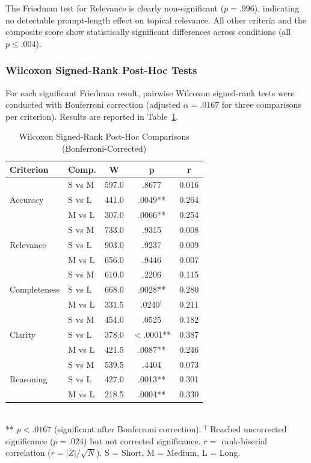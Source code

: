 \documentclass[conference]{IEEEtran}
\begin{document}
The Friedman test for Relevance is clearly non-significant ($p=.996$), indicating no detectable prompt-length effect on topical relevance. All other criteria and the composite score show statistically significant differences across conditions (all $p \leq .004$).

\subsubsection{Wilcoxon Signed-Rank Post-Hoc Tests}
For each significant Friedman result, pairwise Wilcoxon signed-rank tests were conducted with Bonferroni correction (adjusted $\alpha=.0167$ for three comparisons per criterion). Results are reported in Table~\ref{tab:wilcoxon}.

\begin{table}[htbp]
\caption{Wilcoxon Signed-Rank Post-Hoc Comparisons (Bonferroni-Corrected)}
\label{tab:wilcoxon}
\centering
\begin{tabular}{llccc}
\toprule
\textbf{Criterion} & \textbf{Comp.} & \textbf{W} & \textbf{p} & \textbf{r} \\
\midrule
\multirow{3}{*}{Accuracy} & S vs M & 597.0 & .8677 & 0.016 \\
 & S vs L & 441.0 & .0049** & 0.264 \\
 & M vs L & 307.0 & .0066** & 0.254 \\
\midrule
\multirow{3}{*}{Relevance} & S vs M & 733.0 & .9315 & 0.008 \\
 & S vs L & 903.0 & .9237 & 0.009 \\
 & M vs L & 656.0 & .9446 & 0.007 \\
\midrule
\multirow{3}{*}{Completeness} & S vs M & 610.0 & .2206 & 0.115 \\
 & S vs L & 668.0 & .0028** & 0.280 \\
 & M vs L & 331.5 & .0240$^\dagger$ & 0.211 \\
\midrule
\multirow{3}{*}{Clarity} & S vs M & 454.0 & .0525 & 0.182 \\
 & S vs L & 378.0 & $<$.0001** & 0.387 \\
 & M vs L & 421.5 & .0087** & 0.246 \\
\midrule
\multirow{3}{*}{Reasoning} & S vs M & 539.5 & .4404 & 0.073 \\
 & S vs L & 427.0 & .0013** & 0.301 \\
 & M vs L & 218.5 & .0004** & 0.330 \\
\bottomrule
\end{tabular}
\\[4pt]
\footnotesize{** $p<.0167$ (significant after Bonferroni correction). $^\dagger$ Reached uncorrected significance ($p=.024$) but not corrected significance. $r=$ rank-biserial correlation ($r=|Z|/\sqrt{N}$). S = Short, M = Medium, L = Long.}
\end{table}
\end{document}
